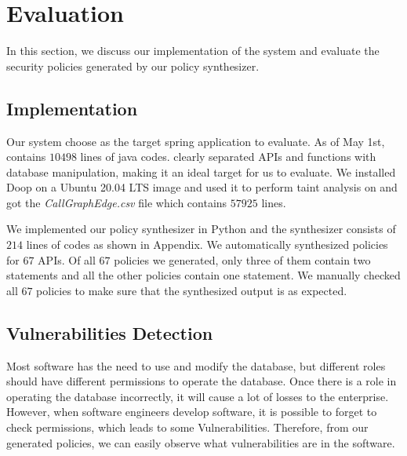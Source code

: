 \section{Evaluation}%




In this section, we discuss our implementation of the system and evaluate the
security policies generated by our policy synthesizer.

\subsection{Implementation}
Our system choose \lancie as the target spring application to evaluate.
%
As of May 1st, \lancie contains $10498$ lines of java codes.
%
\lancie clearly separated APIs and functions with database manipulation, making
it an ideal target for us to evaluate.
%
We installed Doop on a Ubuntu 20.04 LTS image and used it to perform taint
analysis on \lancie and got the \textit{CallGraphEdge.csv} file which contains
$57925$ lines.

We implemented our policy synthesizer in Python and the synthesizer consists of
$214$ lines of codes as shown in Appendix.
%
We automatically synthesized policies for $67$ APIs.
%
Of all $67$ policies we generated, only three of them contain two statements and
all the other policies contain one statement.
%
We manually checked all $67$ policies to make sure that the synthesized output
is as expected.

\subsection{Vulnerabilities Detection}
Most software has the need to use and modify the database, but different roles
should have different permissions to operate the database. Once there is a role
in operating the database incorrectly, it will cause a lot of losses to the
enterprise. However, when software engineers develop software, it is possible to
forget to check permissions, which leads to some Vulnerabilities. Therefore,
from our generated policies, we can easily observe what vulnerabilities are in
the software.



